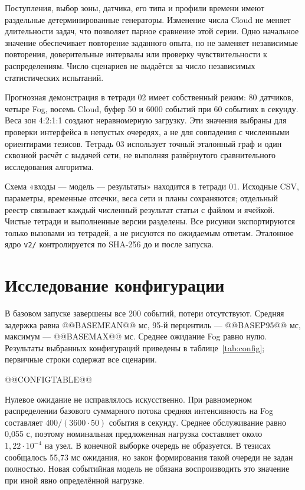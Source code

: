 \documentclass{psta}
\begin{document}
Поступления, выбор зоны, датчика, его типа и профили времени имеют раздельные детерминированные генераторы. Изменение числа Cloud не меняет длительности задач, что позволяет парное сравнение этой серии. Одно начальное значение обеспечивает повторение заданного опыта, но не заменяет независимые повторения, доверительные интервалы или проверку чувствительности к распределениям. Число сценариев не выдаётся за число независимых статистических испытаний.

Прогнозная демонстрация в тетради 02 имеет собственный режим: 80 датчиков, четыре Fog, восемь Cloud, буфер 50 и 6000 событий при 60 событиях в секунду. Веса зон 4:2:1:1 создают неравномерную загрузку. Эти значения выбраны для проверки интерфейса в непустых очередях, а не для совпадения с численными ориентирами тезисов. Тетрадь 03 использует точный эталонный граф и один сквозной расчёт с выдачей сети, не выполняя развёрнутого сравнительного исследования алгоритма.

Схема «входы --- модель --- результаты» находится в тетради 01. Исходные CSV, параметры, временные отсечки, веса сети и планы сохраняются; отдельный реестр связывает каждый численный результат статьи с файлом и ячейкой. Чистые тетради и выполненные версии разделены. Все рисунки экспортируются только вызовами из тетрадей, а не рисуются по ожидаемым ответам. Эталонное ядро \texttt{v2/} контролируется по SHA-256 до и после запуска.

\section{Исследование конфигурации}
В базовом запуске завершены все 200 событий, потери отсутствуют. Средняя задержка равна @@BASEMEAN@@ мс, 95-й перцентиль --- @@BASEP95@@ мс, максимум --- @@BASEMAX@@ мс. Среднее ожидание Fog равно нулю. Результаты выбранных конфигураций приведены в таблице~\ref{tab:config}; первичные строки содержат все сценарии.

@@CONFIGTABLE@@

Нулевое ожидание не исправлялось искусственно. При равномерном распределении базового суммарного потока средняя интенсивность на Fog составляет $400/(3600\cdot50)$ события в секунду. Среднее обслуживание равно 0,055 с, поэтому номинальная предложенная нагрузка составляет около $1{,}22\cdot10^{-4}$ на узел. В конечной выборке очередь не образуется. В тезисах сообщалось 55,73 мс ожидания, но закон формирования такой очереди не задан полностью. Новая событийная модель не обязана воспроизводить это значение при иной явно определённой нагрузке.
\end{document}
